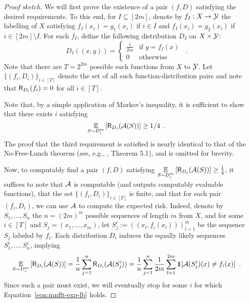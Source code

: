\documentclass[11pt]{article}
\begin{document}
\begin{proof}[Proof sketch]
    We will first prove the existence of a pair $(f,D)$ satisfying the desired requirements.
    To this end, for $I\subseteq [2m]$, denote by $f_I:X\rightarrow\mathcal{Y}$ the labelling of $X$ satisfying $f_I(x_i)=g_1(x_i)$ if $i\in I$ and $f_I(x_i)=g_2(x_i)$ if $i\in [2m]\setminus I$. 
    For each $f_I$, define the following distribution $D_I$ on $X\times \mathcal{Y}$:
    \begin{equation*}
        D_I((x,y))
        =\begin{cases}
            \frac{1}{2m}   & \text{if } y=f_I(x)\\
            0               &\text{otherwise}
        \end{cases}
        \enspace.
    \end{equation*}
    Note that there are $T=2^{2m}$ possible such functions from $X$ to $\mathcal{Y}$.
    Let $\{(f_i,D_i)\}_{i\in[T]}$ denote the set of all such function-distribution pairs and note that $\mathsf{R}_{D_i}(f_i)=0$ for all $i\in[T]$.

    Note that, by a simple application of Markov's inequality, it is sufficient to show that there exists $i$ satisfying
    \begin{equation}
    \label{eqn:mnflt-exp-lb}
        \underset{{S\sim D^m_i}}{\mathbb{E}}\left[\mathsf{R}_{D_i}(\mathcal{A}(S))\right] \geq 1/4\enspace.
    \end{equation}
    The proof that the third requirement is satisfied is nearly identical to that of the No-Free-Lunch theorem (see, e.g., \cite{shalev2014understanding}, Theorem 5.1), and is omitted for brevity. 
    
    Now, to computably find a pair $(f,D)$ satisfying $\underset{{S\sim D^m_i}}{\mathbb{E}}\left[\mathsf{R}_{D_i}(\mathcal{A}(S))\right] \geq \frac{1}{4}$, 
    it suffices to note that $\mathcal{A}$ is computable (and outputs computably evaluable functions), that the set $\{(f_i,D_i)\}_{i\in[T]}$ is finite, and that for each pair $(f_i,D_i)$, we can use $\mathcal{A}$ to compute the expected risk.
    Indeed, denote by $S_1,\dots,S_n$ the $n=(2m)^m$ possible sequences of length $m$ from $X$, and for some $i\in[T]$ and $S_j=(x_1,\dots,x_m)$, let $S_j^i:=((x_l,f_i(x_l)))_{l=1}^m$ be the sequence $S_j$ labeled by $f_i$.
    Each distribution $D_i$ induces the equally likely sequences $S_1^i,\dots,S_n^i$, implying
    \begin{equation*}
        \underset{{S\sim D^m_i}}{\mathbb{E}}\left[\mathsf{R}_{D_i}(\mathcal{A}(S))\right] = \frac{1}{n}\sum_{j=1}^n \mathsf{R}_{D_i}(\mathcal{A}(S_j^i))
        = \frac{1}{n}\sum_{j=1}^n \frac{1}{2m}\sum_{l=1}^{2m}\mathbf{1}[\mathcal{A}(S_j^i)(x)\neq f_i(x)]\enspace.
    \end{equation*}
    Since such a pair must exist, we will eventually stop for some $i$ for which Equation~\ref{eqn:mnflt-exp-lb} holds.
\end{proof}
\end{document}
